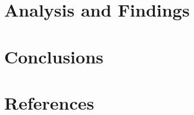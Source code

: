 \documentclass[11pt]{article}
\begin{document}
\smallbreak
\section{Analysis and Findings}

\smallbreak
\section{Conclusions}

\smallbreak
\section{References}

\newpage
\end{document}
